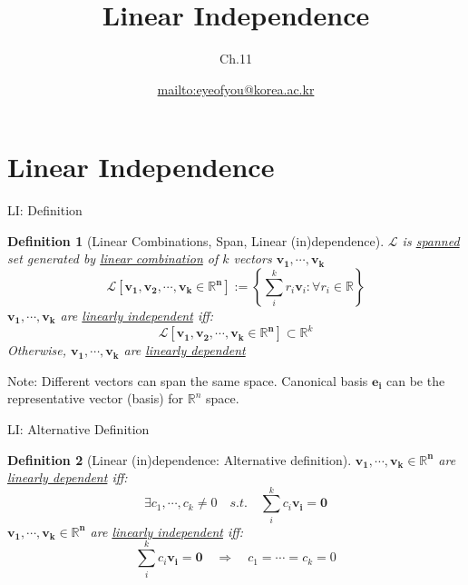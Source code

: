 \documentclass[final]{beamer}
\author[조남운]{\url{mailto:eyeofyou@korea.ac.kr}}
\title{Linear Independence}
\subtitle{Ch.11}
\newtheorem{defn}{Definition}
\begin{document}
	
\maketitle


\section{Linear Independence} %
\label{sec:linear_independence}
\begin{frame}[t]{LI: Definition}
	\begin{defn}
		[Linear Combinations, Span, Linear (in)dependence]
		$\mathcal{L}$ is \uline{spanned} set generated by \uline{linear combination} of $k$ vectors $\mathbf{v_1,\cdots,v_k}$
		\[
			\mathcal{L}[\mathbf{v_1,v_2,\cdots,v_k\in\mathbb{R}^n}]:=\left\{\sum_i^k r_i \mathbf{v}_i: \forall r_i\in \mathbb{R} \right\}
		\]
		$\mathbf{v_1,\cdots,v_k}$ are \uline{linearly independent} iff:
		\[
			\mathcal{L}[\mathbf{v_1,v_2,\cdots,v_k\in\mathbb{R}^n}]\subset \mathbb{R}^k
		\]
		Otherwise, $\mathbf{v_1,\cdots,v_k}$ are \uline{linearly dependent}
	\end{defn}
	Note: Different vectors can span the same space. Canonical basis $\mathbf{e_i}$ can be the representative vector (basis) for $\mathbb{R}^n$ space.
\end{frame}

\begin{frame}[t]{LI: Alternative Definition}
	\begin{defn}
		[Linear (in)dependence: Alternative definition]
		$\mathbf{v_1,\cdots,v_k\in\mathbb{R}^n}$ are \uline{linearly dependent} iff:
		\[
			\exists c_1,\cdots,c_k \neq 0 \quad s.t.\quad \sum_i^k c_i\mathbf{v_i} = \mathbf{0}
		\]
		$\mathbf{v_1,\cdots,v_k\in\mathbb{R}^n}$ are \uline{linearly independent} iff:
		\[
			\sum_i^k c_i\mathbf{v_i} = \mathbf{0} \quad\Rightarrow\quad c_1 = \cdots = c_k = 0
		\]
	\end{defn}
\end{frame}
\end{document}
